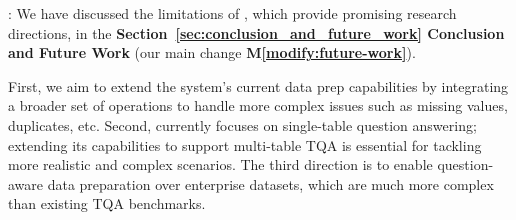 : 
We have discussed the limitations of \sys, which provide promising research directions, in the \textbf{Section~\ref{sec:conclusion_and_future_work} Conclusion and Future Work} (our main change \textbf{M\ref{modify:future-work}}). 

First, we aim to extend the system's current data prep capabilities by integrating a broader set of operations to handle more complex issues such as missing values, duplicates, etc. Second, \sys currently focuses on single-table question answering; extending its capabilities to support multi-table TQA is essential for tackling more realistic and complex scenarios.
The third direction is to enable question-aware data preparation over enterprise datasets, which are much more complex than existing TQA benchmarks. 


%














